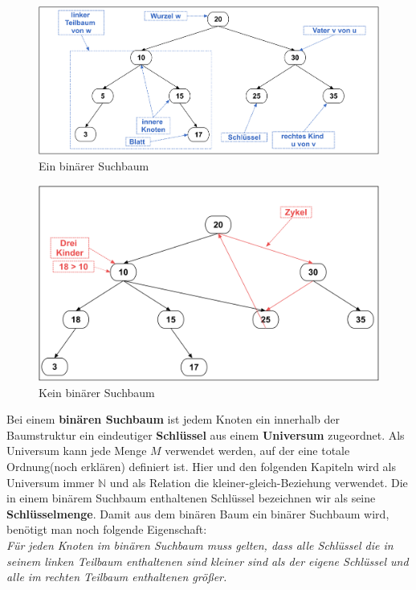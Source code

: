 \documentclass[a4paper,12pt]{article}
\begin{document}
\begin{figure}[h]
	\centering
	\includegraphics[width= 1\textwidth]{"Medien/Einleitung/ioSuchbaum"}
	\caption{Ein binärer Suchbaum }
	\label{fig:ioSuchbaum}
\end{figure}
\begin{figure}[h]
	\centering
	\includegraphics[width= 1\textwidth]{"Medien/Einleitung/nioSuchbaum"}
	\caption{Kein binärer Suchbaum }
	\label{fig:nioSuchbaum}
\end{figure}

\noindent Bei einem \textbf{binären Suchbaum} ist jedem Knoten ein innerhalb der Baumstruktur ein eindeutiger \textbf{Schlüssel} aus einem \textbf{Universum} zugeordnet. Als Universum kann jede Menge $M$ verwendet werden, auf der eine totale Ordnung(noch erklären) definiert ist. Hier und den folgenden Kapiteln wird als Universum immer $\mathbb{N}$ und als Relation die kleiner-gleich-Beziehung verwendet. Die in einem binärem Suchbaum enthaltenen Schlüssel bezeichnen wir als seine \textbf{Schlüsselmenge}.  Damit aus dem binären Baum ein binärer Suchbaum wird, benötigt man noch folgende Eigenschaft:\\
\textit{Für jeden Knoten im binären Suchbaum muss gelten, dass alle Schlüssel die in seinem linken Teilbaum enthaltenen sind kleiner sind als der eigene Schlüssel und alle im rechten Teilbaum enthaltenen größer.} \\
\end{document}
